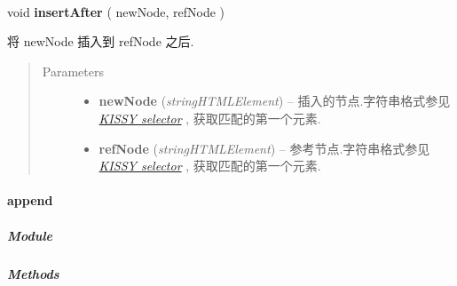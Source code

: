 \documentclass[letterpaper,10pt,english]{sphinxmanual}
\begin{document}
\begin{fulllineitems}
\label{api/core/dom/insertAfter:DOM.insertAfter}~
\begin{DUlineblock}{0em}
\item[] void \textbf{insertAfter} ( newNode, refNode )
\item[] 将 newNode 插入到 refNode 之后.
\end{DUlineblock}
\begin{quote}\begin{description}
\item[{Parameters}] \leavevmode\begin{itemize}
\item {}
\textbf{newNode} (\emph{string\textbar{}HTMLElement}) -- 插入的节点.字符串格式参见 {\hyperref[api/core/dom/selector:dom-selector]{\emph{KISSY selector}}} , 获取匹配的第一个元素.

\item {}
\textbf{refNode} (\emph{string\textbar{}HTMLElement}) -- 参考节点.字符串格式参见 {\hyperref[api/core/dom/selector:dom-selector]{\emph{KISSY selector}}} , 获取匹配的第一个元素.

\end{itemize}

\end{description}\end{quote}

\end{fulllineitems}



\paragraph{append}
\label{api/core/dom/append::doc}\label{api/core/dom/append:append}

\subparagraph{Module}
\label{api/core/dom/append:module}\begin{quote}

{\hyperref[api/core/dom/index:module-DOM]{}}
\end{quote}


\subparagraph{Methods}
\label{api/core/dom/append:methods}
\end{document}
